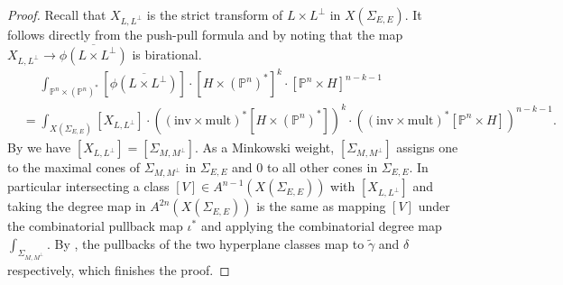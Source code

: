 \documentclass[12pt,a4paper,english]{scrartcl}
\newcommand{\PP}{\mathbb{P}}
\begin{document}
\begin{proof}
Recall that $X_{L,L^\perp}$ is the strict transform of $L\times L^\perp$ in $X(\Sigma_{E,E})$.
    It follows directly from the push-pull formula and by noting that the map $X_{L,L^\perp}\to \overline{\phi(L\times L^\perp)}$ is birational. \begin{align*}
    &\mathrel{\phantom{=}} \int_{\PP^n \times (\PP^n)^*}[\overline{\phi(L\times L^\perp)}]\cdot[H \times (\PP^n)^*]^k\cdot[\PP^n\times H]^{n-k-1}\\
    &= \int_{X(\Sigma_{E,E})}[X_{L,L^\perp}]\cdot((\text{inv}\times\text{mult})^*[H \times (\PP^n)^*])^k\cdot ((\text{inv}\times\text{mult})^*[\PP^n\times H])^{n-k-1}.
    \end{align*}
     By  we have $[X_{L,L^\perp}]=[\Sigma_{M,M^\perp}]$. As a Minkowski weight, $[\Sigma_{M,M^\perp}]$ assigns one to the maximal cones of $\Sigma_{M,M^\perp}$ in $\Sigma_{E,E}$ and 0 to all other cones in $\Sigma_{E,E}$. In particular intersecting a class $[V]\in A^{n-1}(X(\Sigma_{E,E}))$ with $[X_{L,L^\perp}]$ and taking the degree map in $A^{2n}(X(\Sigma_{E,E}))$ is the same as mapping $[V]$ under the combinatorial pullback map $\iota^*$ and applying the combinatorial degree map $\int_{\Sigma_{M,M^\perp}}$. By , the pullbacks of the two hyperplane classes map to $\widetilde{\gamma}$ and $\delta$ respectively, which finishes the proof.
\end{proof}
\end{document}
